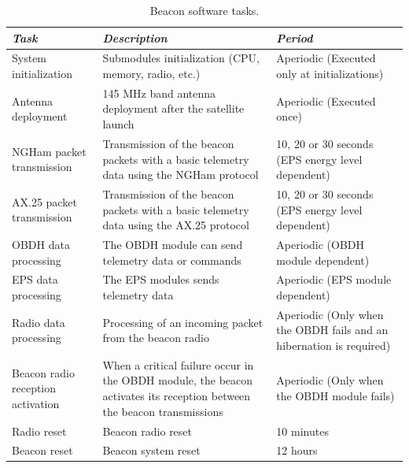 \documentclass[12pt]{book}
\begin{document}
\begin{table}[!h]
	\begin{center}
		\begin{tabular}{L{0.2\textwidth} C{0.4\textwidth} C{0.3\textwidth}}
			\toprule[1.5pt]
			\textit{Task} & \textit{Description} & \textit{Period} \\
			\midrule
			System initialization & Submodules initialization (CPU, memory, radio, etc.) & Aperiodic (Executed only at initializations) \\
			Antenna deployment & 145 MHz band antenna deployment after the satellite launch & Aperiodic (Executed once) \\
			NGHam packet transmission & Transmission of the beacon packets with a basic telemetry data using the NGHam protocol & 10, 20 or 30 seconds (EPS energy level dependent) \\
			AX.25 packet transmission & Transmission of the beacon packets with a basic telemetry data using the AX.25 protocol & 10, 20 or 30 seconds (EPS energy level dependent) \\
			OBDH data processing & The OBDH module can send telemetry data or commands & Aperiodic (OBDH module dependent) \\
			EPS data processing & The EPS modules sends telemetry data & Aperiodic (EPS module dependent) \\
			Radio data processing & Processing of an incoming packet from the beacon radio & Aperiodic (Only when the OBDH fails and an hibernation is required) \\
			Beacon radio reception activation & When a critical failure occur in the OBDH module, the beacon activates its reception between the beacon transmissions & Aperiodic (Only when the OBDH module fails) \\
			Radio reset & Beacon radio reset & 10 minutes \\
			Beacon reset & Beacon system reset & 12 hours \\
			\bottomrule[1.5pt]
		\end{tabular}
		\caption{Beacon software tasks.}
		\label{tab:sw_tasks}
	\end{center}
\end{table}

\end{document}
